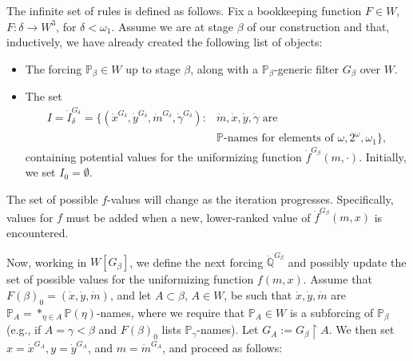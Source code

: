 \documentclass[a4paper,11pt]{article}
\newcommand{\forceP}{\mathbb{P}}
\newcommand{\forceQ}{\mathbb{Q}}
\begin{document}
The infinite set of rules is defined as follows. Fix a bookkeeping function \( F \in W \), \( F : \delta \to W^3 \), for \( \delta < \omega_1 \). Assume we are at stage \( \beta \) of our construction and that, inductively, we have already created the following list of objects:

\begin{itemize}
\item The forcing \( \forceP_{\beta} \in W \) up to stage \( \beta \), along with a \( \forceP_{\beta} \)-generic filter \( G_{\beta} \) over \( W \).
  
\item The set
\begin{align*}
    I = \dot{I}_{\delta}^{G_{\delta}} =  \{ (\dot{x}^{G_{\delta}}, \dot{y}^{G_{\delta}}, \dot{m}^{G_{\delta}}, \dot{\gamma}^{G_{\delta}}) : & \dot{m} , \dot{x}, \dot{y}, \dot{\gamma} \text{ are } \\& \forceP \text{-names for elements of } \omega, 2^{\omega}, \omega_1 \},
\end{align*}
 containing potential values for the uniformizing function \( \dot{f}^{G_{\beta}}(m, \cdot) \). Initially, we set \( I_0 = \emptyset \).
\end{itemize}

The set of possible \( f \)-values will change as the iteration progresses. Specifically, values for \( f \) must be added when a new, lower-ranked value of \( \dot{f}^{G_{\beta}}(m, x) \) is encountered. 

Now, working in \( W[G_{\beta}] \), we define the next forcing \( \dot{\forceQ}^{G_{\beta}} \) and possibly update the set of possible values for the uniformizing function \( f(m, x) \). Assume that \( F(\beta)_0 = (\dot{x}, \dot{y}, \dot{m}) \), and let \( A \subset \beta \), \( A \in W \), be such that \( \dot{x}, \dot{y}, \dot{m} \) are \( \forceP_A = \ast_{\eta \in A} \forceP(\eta) \)-names, where we require that \( \forceP_A \in W \) is a subforcing of \( \forceP_{\beta} \) (e.g., if \( A = \gamma < \beta \) and \( F(\beta)_0 \) lists \( \forceP_{\gamma} \)-names). Let \( G_A := G_{\beta} \upharpoonright A \). We then set \( x = \dot{x}^{G_A}, y = \dot{y}^{G_A} \), and \(m= \dot{m}^{G_A} \), and proceed as follows:
\end{document}
